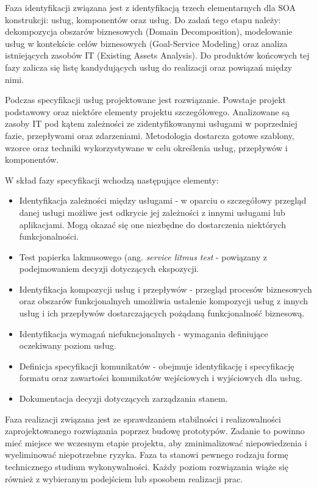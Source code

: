 Faza identyfikacji związana jest z identyfikacją trzech elementarnych dla SOA konstrukcji: usług, komponentów oraz usług.\cite{PlatIntGor} Do zadań tego etapu należy: dekompozycja obszarów biznesowych (Domain Decomposition), modelowanie usług w kontekście celów biznesowych (Goal-Service Modeling) oraz analiza istniejących zasobów IT (Existing Assets Analysis).\cite{SOMAibmRosSuda} Do produktów końcowych tej fazy zalicza się listę kandydujących usług do realizacji oraz powiązań między nimi. \cite{PlatIntGor}

Podczas specyfikacji usług projektowane jest rozwiązanie. Powstaje projekt podstawowy oraz niektóre elementy projektu szczegółowego. Analizowane są zasoby IT pod kątem zależności ze zidentyfikowanymi usługami w poprzedniej fazie, przepływami oraz zdarzeniami. Metodologia dostarcza gotowe szablony, wzorce oraz techniki wykorzystywane w celu określenia usług, przepływów i komponentów. 

W skład fazy specyfikacji wchodzą następujące elementy:
\begin{itemize}
\item{Identyfikacja zależności między usługami - w oparciu o szczegółowy przegląd danej usługi możliwe jest odkrycie jej zależności z innymi usługami lub aplikacjami. Mogą okazać się one niezbędne do dostarczenia niektórych funkcjonalności.}
\item{Test papierka lakmusowego (ang. \textit{service litmus test} - powiązany z podejmowaniem decyzji dotyczących ekspozycji.}
\item{Identyfikacja kompozycji usług i przepływów - przegląd procesów biznesowych oraz obszarów funkcjonalnych umożliwia ustalenie kompozycji usług z innych usług i ich przepływów dostarczających pożądaną funkcjonalność biznesową.}
\item{Identyfikacja wymagań niefukncjonalnych - wymagania definiujące oczekiwany poziom usług.}
\item{Definicja specyfikacji komunikatów - obejmuje identyfikację i specyfikację formatu oraz zawartości komunikatów wejściowych i wyjściowych dla usług.}
\item{Dokumentacja decyzji dotyczących zarządzania stanem.}
\end{itemize}

Faza realizacji związana jest ze sprawdzaniem stabilności i realizowalności zaprojektowanego rozwiązania poprzez budowę prototypów. Zadanie to powinno mieć miejsce we wczesnym etapie projektu, aby zminimalizować niepowiedzenia i wyeliminować niepotrzebne ryzyka. Faza ta stanowi pewnego rodzaju formę technicznego studium wykonywalności. Każdy poziom rozwiązania wiąże się również z wybieranym podejściem lub sposobem realizacji prac.

